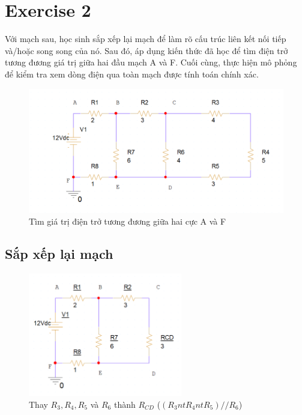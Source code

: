\section{Exercise 2}
Với mạch sau, học sinh sắp xếp lại mạch để làm rõ cấu trúc liên kết nối tiếp và/hoặc song song của nó. Sau đó, áp dụng kiến thức đã học để tìm điện trở tương đương
giá trị giữa hai đầu mạch A và F. Cuối cùng, thực hiện mô phỏng để kiểm tra xem
dòng điện qua toàn mạch được tính toán chính xác.\\
\begin{figure}[!htbp]
\centering
\includegraphics[width=1\textwidth]{graphics/ex2/f1.png}
\caption{Tìm giá trị điện trở tương đương giữa hai cực A và F}
\end{figure}
\subsection{Sắp xếp lại mạch}
\begin{figure}[!htbp]
    \centering
    \includegraphics[width=0.6\textwidth]{graphics/ex2/f4.png}
    \caption{Thay \(R_3, R_4, R_5\) và \(R_6\) thành \(R_{CD}\) (\((R_3 nt R_4 nt R_5)//R_6\))}
\end{figure}   

